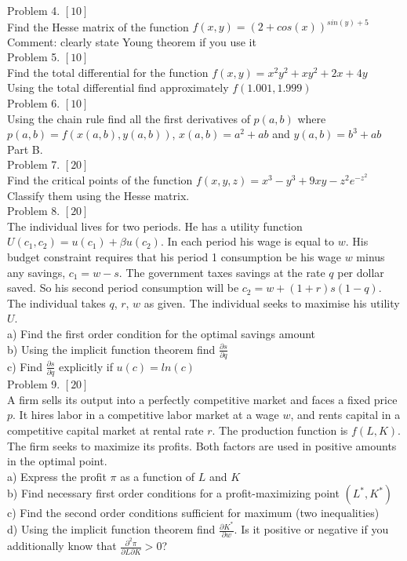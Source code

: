 \documentclass[12pt]{article} %
\theoremstyle{definition} %
\begin{document}
Problem 4. $[10]$ \\
Find the Hesse matrix of the function $f(x,y)=(2+cos(x))^{sin(y)+5}$\\
Comment: clearly state Young theorem if you use it \\

Problem 5. $[10]$ \\
Find the total differential for the function $f(x,y)=x^2y^2+xy^2+2x+4y$\\
Using the total differential find approximately $f(1.001,1.999)$ \\

Problem 6. $[10]$ \\
Using the chain rule find all the first derivatives of  $p(a,b)$ where $p(a,b)=f(x(a,b),y(a,b))$, $x(a,b)=a^2+ab$ and $y(a,b)=b^3+ab$ \\


Part B. \\

Problem 7. $[20]$ \\
Find the critical points of the function $f(x,y,z)=x^3-y^3+9xy-z^2e^{-z^2}$\\
Classify them using the Hesse matrix. \\

Problem 8. $[20]$ \\
The individual lives for two periods.  He has a utility function $U(c_{1},c_{2})=u(c_{1})+\beta u(c_{2})$. In each period his wage is equal to $w$. His budget constraint requires that his period 1 consumption be his wage $w$ minus any savings, $c_{1}=w-s$. The government taxes savings at the rate $q$ per dollar saved. So his second period consumption will be $c_{2}= w + (1+ r)s(1-q)$.  The individual takes $q$, $r$, $w$ as given. The individual seeks to maximise his utility $U$.\\
a)	Find the first order condition for the optimal savings amount\\
b)	Using the implicit function theorem find $\frac{\partial s}{\partial q}$\\
c)	Find $\frac{\partial s}{\partial q}$ explicitly if $u(c)=ln(c)$\\

Problem 9. $[20]$ \\
A firm sells its output into a perfectly competitive market and faces a fixed price $p$. It hires labor in a competitive labor market at a wage $w$, and rents capital in a competitive capital market at rental rate $r$. The production function is $f(L, K)$. The firm seeks to maximize its profits. Both factors are used in positive amounts in the optimal point. \\
a)	Express the profit $\pi$ as a function of $L$ and $K$\\
b)	Find necessary first order conditions for a profit-maximizing point $(L^{*},K^{*})$\\
c)	Find the second order conditions sufficient for maximum (two inequalities)\\
d)	Using the implicit function theorem find $\frac{\partial K^{*}}{\partial w}$.  Is it positive or negative if you additionally know that $\frac{\partial^{2}\pi}{\partial L\partial K}>0$?\\
\end{document}
